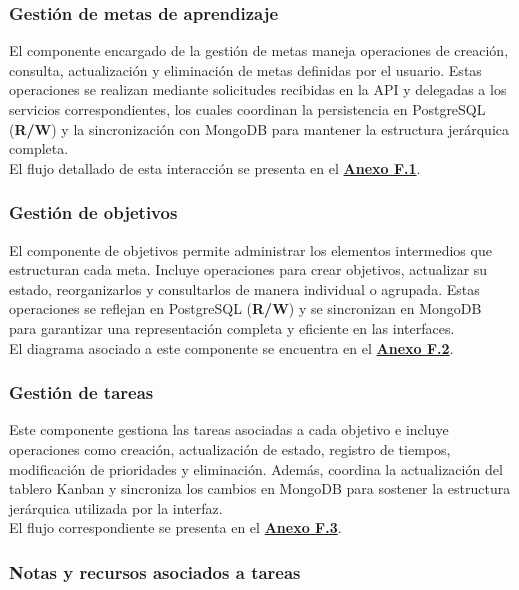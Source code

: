 \subsubsection{Gestión de metas de aprendizaje}

El componente encargado de la gestión de metas maneja operaciones de creación, consulta, actualización y eliminación de metas definidas por el usuario. Estas operaciones se realizan mediante solicitudes recibidas en la API y delegadas a los servicios correspondientes, los cuales coordinan la persistencia en PostgreSQL (\textbf{R/W}) y la sincronización con MongoDB para mantener la estructura jerárquica completa.
\\

El flujo detallado de esta interacción se presenta en el \hyperref[fig:anexoF-learning-goals]{\textbf{Anexo F.1}}.

\subsubsection{Gestión de objetivos}

El componente de objetivos permite administrar los elementos intermedios que estructuran cada meta. Incluye operaciones para crear objetivos, actualizar su estado, reorganizarlos y consultarlos de manera individual o agrupada. Estas operaciones se reflejan en PostgreSQL (\textbf{R/W}) y se sincronizan en MongoDB para garantizar una representación completa y eficiente en las interfaces.
\\

El diagrama asociado a este componente se encuentra en el \hyperref[fig:anexoF-objectives]{\textbf{Anexo F.2}}.

\subsubsection{Gestión de tareas}

Este componente gestiona las tareas asociadas a cada objetivo e incluye operaciones como creación, actualización de estado, registro de tiempos, modificación de prioridades y eliminación. Además, coordina la actualización del tablero Kanban y sincroniza los cambios en MongoDB para sostener la estructura jerárquica utilizada por la interfaz.
\\

El flujo correspondiente se presenta en el \hyperref[fig:anexoF-tasks]{\textbf{Anexo F.3}}.

\subsubsection{Notas y recursos asociados a tareas}

